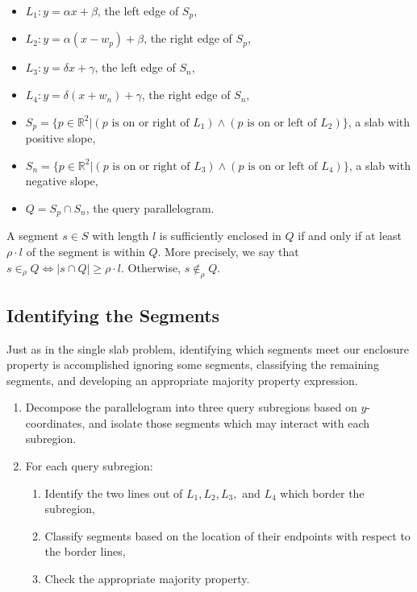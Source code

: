 \begin{itemize}
 \item $L_1 : y = \alpha x + \beta$, the left edge of $S_p$,

 \item $L_2 : y = \alpha (x - w_p) + \beta$, the right edge of $S_p$,

 \item $L_3 : y = \delta x + \gamma$, the left edge of $S_n$,

 \item $L_4 : y = \delta (x + w_n) + \gamma$, the right edge of $S_n$,

 \item $S_p = \{ p \in \mathbb{R}^2 | (p \text{ is on or right of } L_1) \wedge (p \text{ is on or left of } L_2) \}$, a slab with positive slope,

 \item $S_n = \{ p \in \mathbb{R}^2 | (p \text{ is on or right of } L_3) \wedge (p \text{ is on or left of } L_4) \}$, a slab with negative slope,

 \item $Q = S_p \cap S_n$, the query parallelogram.

\end{itemize}

A segment $s \in S$ with length $l$ is sufficiently enclosed in $Q$ if and only if at least $\rho \cdot l$ of the segment is within $Q$. More precisely, we say that $s \in_\rho Q \Leftrightarrow |s \cap Q| \geq \rho \cdot l$. Otherwise, $s \not \in_\rho Q$.


\subsection{Identifying the Segments}
\label{:slabs:two:approach}

Just as in the single slab problem, identifying which segments meet our enclosure property is accomplished ignoring some segments, classifying the remaining segments, and developing an appropriate majority property expression.

\begin{enumerate}
 \item Decompose the parallelogram into three query subregions based on $y$-coordinates, and isolate those segments which may interact with each subregion.

 \item For each query subregion:
 \begin{enumerate}
  \item Identify the two lines out of $L_1, L_2, L_3,$ and $L_4$ which border the subregion,
  \item Classify segments based on the location of their endpoints with respect to the border lines,
  \item Check the appropriate majority property.
 \end{enumerate}
\end{enumerate}

